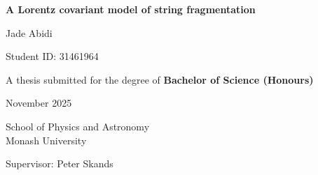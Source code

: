 \documentclass[12pt,a4paper]{report}
\begin{document}
\begin{titlepage}
  \centering
  \vspace*{2cm}
  {\LARGE\bfseries A Lorentz covariant model of string fragmentation \par}
  \vspace{1.5cm}
  \Large Jade Abidi \par
  \vspace{0.5cm}
  \large Student ID: 31461964 \par
  \vspace{0.5cm}
  {\large A thesis submitted for the degree of \bfseries{Bachelor of Science (Honours)}} \par
  \vspace{0.5cm}
  \large November 2025 \par
  \vspace{0.5cm}
  \vfill
  \large School of Physics and Astronomy \\ Monash University \par
  \vspace{0.5cm}
  \large Supervisor: Peter Skands \par
  \vfill
\end{titlepage}

\pagebreak

\begin{abstract}
Monte Carlo event generators are extensively used to simulate high-energy particle-collision events. For analytically intractable aspects, they rely on phenomenological models. The so-called Lund model describes the non-perturbative hadronisation process as the fragmentation of a classical string with constant tension. Lorentz covariance then implies the self-similarity of this fragmentation process along the string. The current formulaion of the Lund model, used in the PYTHIA generator, violates this property in terms of both kinematic distributions and hadronic chemistry. We introduce an additional tunable parameter that lessens this violation, and propose a new model for string fragmentation that preserves Lorentz covariance.
\end{abstract}

\pagebreak

\tableofcontents
\end{document}
